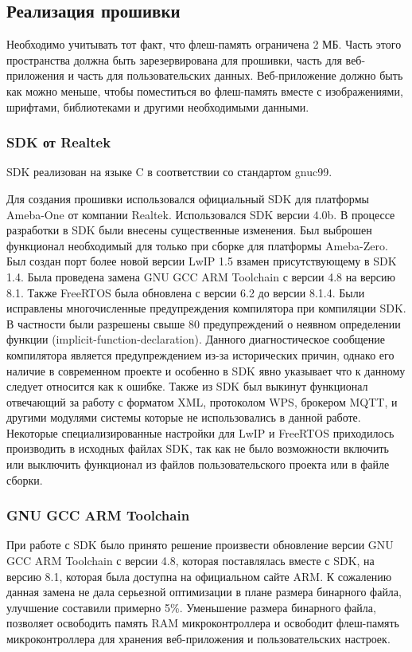 \subsection{Реализация прошивки}
Необходимо учитывать тот факт, что флеш-память ограничена 2 МБ. Часть этого пространства должна быть зарезервирована для прошивки, часть для веб-приложения и часть для пользовательских данных. Веб-приложение должно быть как можно меньше, чтобы поместиться во флеш-память вместе с изображениями, шрифтами, библиотеками и другими необходимыми данными. 

\subsubsection{SDK от Realtek}
SDK реализован на языке C в соответствии со стандартом gnuc99.

Для создания прошивки использовался официальный SDK для платформы Ameba-One от компании Realtek.
Использовался SDK версии 4.0b.
В процессе разработки в SDK были внесены существенные изменения. Был выброшен функционал необходимый для только при сборке для платформы Ameba-Zero. Был создан порт более новой версии LwIP 1.5 взамен присутствующему в SDK 1.4. Была проведена замена GNU GCC ARM Toolchain с версии 4.8 на версию 8.1. Также FreeRTOS была обновлена с версии 6.2 до версии 8.1.4. Были исправлены многочисленные предупреждения компилятора при компиляции SDK. В частности были разрешены свыше 80 предупреждений о неявном определении функции (implicit-function-declaration). Данного диагностическое сообщение компилятора является предупреждением из-за исторических причин, однако его наличие в современном проекте и особенно в SDK явно указывает что к данному следует относится как к ошибке. Также из SDK был выкинут функционал отвечающий за работу с форматом XML, протоколом WPS, брокером MQTT, и другими модулями системы которые не использовались в данной работе. Некоторые специализированные настройки для LwIP и FreeRTOS приходилось производить в исходных файлах SDK, так как не было возможности включить или выключить функционал из файлов пользовательского проекта или в файле сборки.


\subsubsection{GNU GCC ARM Toolchain}
При работе с SDK было принято решение произвести обновление версии GNU GCC ARM Toolchain с версии 4.8, которая поставлялась вместе с SDK, на версию 8.1, которая была доступна на официальном сайте ARM.
К сожалению данная замена не дала серьезной оптимизации в плане размера бинарного файла, улучшение составили примерно 5\%. Уменьшение размера бинарного файла, позволяет освободить память RAM микроконтроллера и освободит флеш-память микроконтроллера для хранения веб-приложения и пользовательских настроек.

